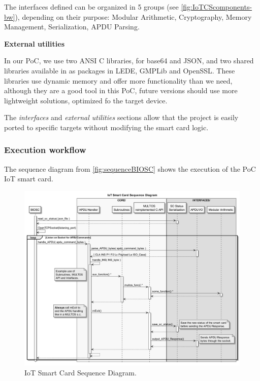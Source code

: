 \documentclass[journal]{IEEEtran}
\begin{document}
The interfaces defined can be organized in 5 groups (see \autoref{fig:IoTCScomponents-bw}), depending on their purpose: Modular Arithmetic, Cryptography, Memory Management, Serialization, APDU Parsing.


\textbf{External utilities}\hfil

In our PoC, we use two ANSI C libraries, for base64 and JSON, and two shared libraries available in as packages in LEDE, GMPLib and OpenSSL. These libraries use dynamic memory and offer more functionality than we need, although they are a good tool in this PoC, future versions should use more lightweight solutions, optimized fo the target device.

\hfil

The \textit{interfaces} and \textit{external utilities} sections  allow that the project is easily ported to specific targets without modifying the smart card logic.



\subsubsection{Execution workflow}

The sequence diagram from \autoref{fig:sequenceBIOSC} shows the execution of the PoC IoT smart card.



\begin{figure}[bth]
	\begin{center}
		\includegraphics[width=\linewidth]{gfx/UML/sequenceBIOSC}
	\end{center}
	\caption{IoT Smart Card Sequence Diagram.}
	\label{fig:sequenceBIOSC}
\end{figure}
\end{document}
